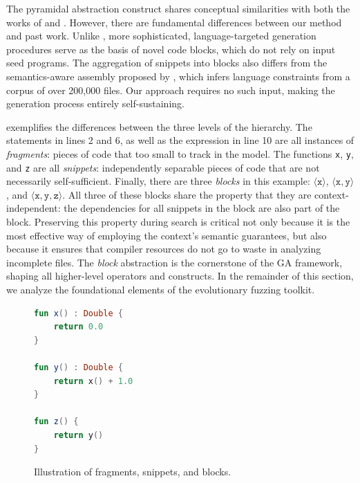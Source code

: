 The pyramidal abstraction construct shares conceptual similarities with both
the works of \citet{holler2012fuzzing} and \citet{han2019codealchemist}.
However, there are fundamental differences between our method and past work.
Unlike \citet{holler2012fuzzing}, more sophisticated, language-targeted
generation procedures serve as the basis of novel code blocks, which do not
rely on input seed programs.
The aggregation of snippets into blocks also differs from the semantics-aware
assembly proposed by \citet{han2019codealchemist}, which infers language constraints
from a corpus of over 200,000 files.
Our approach requires no such input, making the generation process entirely self-sustaining. 

 exemplifies the differences between the three levels
of the hierarchy.
The statements in lines 2 and 6, as well as the expression
in line 10 are all instances of \textit{fragments}: pieces
of code that too small to track in the model.
The functions \texttt{x}, \texttt{y}, and \texttt{z} are all \textit{snippets}:
independently separable pieces of code that are not necessarily self-sufficient.
Finally, there are three \textit{blocks} in this example: $\langle \texttt{x} \rangle$,
$\langle \texttt{x}, \texttt{y} \rangle$,
and $\langle \texttt{x}, \texttt{y}, \texttt{z} \rangle$.
All three of these blocks share the property that they are context-independent:
the dependencies for all snippets in the block are also part of the block.
Preserving this property during search is critical not only because it is the most
effective way of employing the context's semantic guarantees,
but also because it ensures that compiler resources do not go to waste
in analyzing incomplete files.
The \textit{block} abstraction is the cornerstone of the 
\gls{GA} framework, shaping all higher-level operators and constructs.
In the remainder of this section, we analyze the foundational elements of
the evolutionary fuzzing toolkit.

\begin{figure}
\begin{lstlisting}[language=Kotlin]
fun x() : Double {
	return 0.0
}

fun y() : Double {
	return x() + 1.0
}

fun z() {
	return y()
}
\end{lstlisting}
\caption{Illustration of fragments, snippets, and blocks.}
\label{fig:blocks}
\end{figure}


